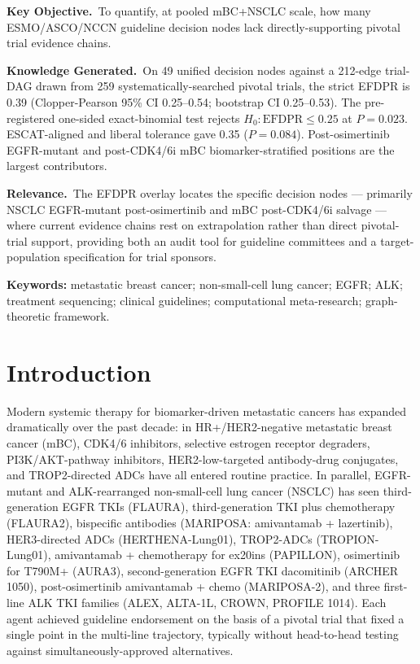 \documentclass[11pt,a4paper]{article}
\begin{document}
\medskip
\begin{mdframed}[linewidth=0.5pt,roundcorner=4pt,backgroundcolor=gray!8]
\small
\textbf{Key Objective.}\,
To quantify, at pooled mBC+NSCLC scale, how many ESMO/ASCO/NCCN guideline decision nodes lack directly-supporting pivotal trial evidence chains.

\textbf{Knowledge Generated.}\,
On 49 unified decision nodes against a 212-edge trial-DAG drawn from 259 systematically-searched pivotal trials, the strict EFDPR is 0.39 (Clopper-Pearson 95\% CI 0.25--0.54; bootstrap CI 0.25--0.53). The pre-registered one-sided exact-binomial test rejects $H_0: \mathrm{EFDPR} \le 0.25$ at $P = 0.023$. ESCAT-aligned and liberal tolerance gave 0.35 ($P = 0.084$). Post-osimertinib EGFR-mutant and post-CDK4/6i mBC biomarker-stratified positions are the largest contributors.

\textbf{Relevance.}\,
The EFDPR overlay locates the specific decision nodes — primarily NSCLC EGFR-mutant post-osimertinib and mBC post-CDK4/6i salvage — where current evidence chains rest on extrapolation rather than direct pivotal-trial support, providing both an audit tool for guideline committees and a target-population specification for trial sponsors.
\end{mdframed}

\medskip
\noindent\textbf{Keywords:} metastatic breast cancer; non-small-cell lung cancer; EGFR; ALK; treatment sequencing; clinical guidelines; computational meta-research; graph-theoretic framework.

\section{Introduction}\label{sec:intro}
Modern systemic therapy for biomarker-driven metastatic cancers has expanded dramatically over the past decade: in HR+/HER2-negative metastatic breast cancer (mBC), CDK4/6 inhibitors, selective estrogen receptor degraders, PI3K/AKT-pathway inhibitors, HER2-low-targeted antibody-drug conjugates, and TROP2-directed ADCs have all entered routine practice.\citep{cardosoESMO2024,gradishar2023nccn,giordano2022asco} In parallel, EGFR-mutant and ALK-rearranged non-small-cell lung cancer (NSCLC) has seen third-generation EGFR TKIs (FLAURA),\citep{soria2018flaura} third-generation TKI plus chemotherapy (FLAURA2),\citep{janne2024flaura2} bispecific antibodies (MARIPOSA: amivantamab + lazertinib),\citep{cho2024mariposa} HER3-directed ADCs (HERTHENA-Lung01),\citep{yu2024herthena} TROP2-ADCs (TROPION-Lung01),\citep{ahn2024tropion} amivantamab + chemotherapy for ex20ins (PAPILLON),\citep{zhou2024papillon} osimertinib for T790M+ (AURA3),\citep{mok2017aura3} second-generation EGFR TKI dacomitinib (ARCHER 1050),\citep{wu2017archer1050} post-osimertinib amivantamab + chemo (MARIPOSA-2),\citep{passaro2024mariposa2} and three first-line ALK TKI families (ALEX, ALTA-1L, CROWN, PROFILE 1014).\citep{peters2017alex,camidge2018altal1,shaw2020crown,solomon2014profile1014} Each agent achieved guideline endorsement\citep{hendriks2023esmo,nccn_nsclc_2024} on the basis of a pivotal trial that fixed a single point in the multi-line trajectory, typically without head-to-head testing against simultaneously-approved alternatives.
\end{document}
